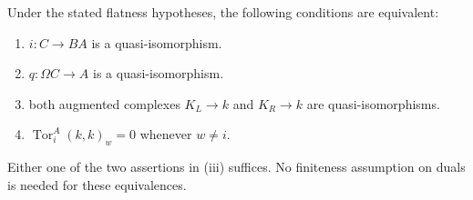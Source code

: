 \begin{theorem}\label{cbc:quadratic:criterion}
Under the stated flatness hypotheses, the following conditions are equivalent:
\begin{enumerate}
\item $i:C\to BA$ is a quasi-isomorphism.
\item $q:\Omega C\to A$ is a quasi-isomorphism.
\item both augmented complexes $K_L\to k$ and $K_R\to k$ are quasi-isomorphisms.
\item $\operatorname{Tor}^A_i(k,k)_w=0$ whenever $w\ne i$.
\end{enumerate}
Either one of the two assertions in (iii) suffices.
No finiteness assumption on duals is needed for these equivalences.
\end{theorem}
